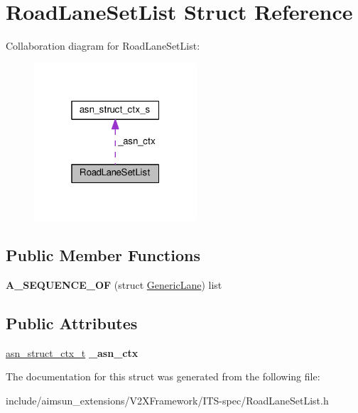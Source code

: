 \hypertarget{structRoadLaneSetList}{}\section{Road\+Lane\+Set\+List Struct Reference}
\label{structRoadLaneSetList}


Collaboration diagram for Road\+Lane\+Set\+List\+:\nopagebreak
\begin{figure}[H]
\begin{center}
\leavevmode
\includegraphics[width=172pt]{structRoadLaneSetList__coll__graph}
\end{center}
\end{figure}
\subsection*{Public Member Functions}
\begin{DoxyCompactItemize}
\item 
{\bfseries A\+\_\+\+S\+E\+Q\+U\+E\+N\+C\+E\+\_\+\+OF} (struct \hyperlink{structGenericLane}{Generic\+Lane}) list\hypertarget{structRoadLaneSetList_af55fa680d4f744b4443d56e65ed07c54}{}\label{structRoadLaneSetList_af55fa680d4f744b4443d56e65ed07c54}

\end{DoxyCompactItemize}
\subsection*{Public Attributes}
\begin{DoxyCompactItemize}
\item 
\hyperlink{structasn__struct__ctx__s}{asn\+\_\+struct\+\_\+ctx\+\_\+t} {\bfseries \+\_\+asn\+\_\+ctx}\hypertarget{structRoadLaneSetList_a4c9fb4cf4b1718fa239df12081dcfb45}{}\label{structRoadLaneSetList_a4c9fb4cf4b1718fa239df12081dcfb45}

\end{DoxyCompactItemize}


The documentation for this struct was generated from the following file\+:\begin{DoxyCompactItemize}
\item 
include/aimsun\+\_\+extensions/\+V2\+X\+Framework/\+I\+T\+S-\/spec/Road\+Lane\+Set\+List.\+h\end{DoxyCompactItemize}
